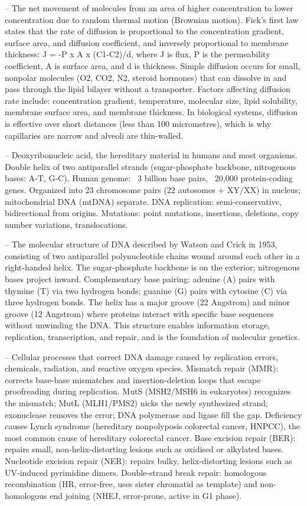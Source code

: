 -- The net movement of molecules from an area of higher concentration to lower concentration due to random thermal motion (Brownian motion). Fick's first law states that the rate of diffusion is proportional to the concentration gradient, surface area, and diffusion coefficient, and inversely proportional to membrane thickness: J = -P x A x (C1-C2)/d, where J is flux, P is the permeability coefficient, A is surface area, and d is thickness. Simple diffusion occurs for small, nonpolar molecules (O2, CO2, N2, steroid hormones) that can dissolve in and pass through the lipid bilayer without a transporter. Factors affecting diffusion rate include: concentration gradient, temperature, molecular size, lipid solubility, membrane surface area, and membrane thickness. In biological systems, diffusion is effective over short distances (less than 100 micrometres), which is why capillaries are narrow and alveoli are thin-walled.

-- Deoxyribonucleic acid, the hereditary material in humans and most organisms. Double helix of two antiparallel strands (sugar-phosphate backbone, nitrogenous bases: A-T, G-C). Human genome: ~3 billion base pairs, ~20,000 protein-coding genes. Organized into 23 chromosome pairs (22 autosomes + XY/XX) in nucleus; mitochondrial DNA (mtDNA) separate. DNA replication: semi-conservative, bidirectional from origins. Mutations: point mutations, insertions, deletions, copy number variations, translocations.

-- The molecular structure of DNA described by Watson and Crick in 1953, consisting of two antiparallel polynucleotide chains wound around each other in a right-handed helix. The sugar-phosphate backbone is on the exterior; nitrogenous bases project inward. Complementary base pairing: adenine (A) pairs with thymine (T) via two hydrogen bonds; guanine (G) pairs with cytosine (C) via three hydrogen bonds. The helix has a major groove (22 Angstrom) and minor groove (12 Angstrom) where proteins interact with specific base sequences without unwinding the DNA. This structure enables information storage, replication, transcription, and repair, and is the foundation of molecular genetics.

-- Cellular processes that correct DNA damage caused by replication errors, chemicals, radiation, and reactive oxygen species. Mismatch repair (MMR): corrects base-base mismatches and insertion-deletion loops that escape proofreading during replication. MutS (MSH2/MSH6 in eukaryotes) recognizes the mismatch; MutL (MLH1/PMS2) nicks the newly synthesized strand; exonuclease removes the error; DNA polymerase and ligase fill the gap. Deficiency causes Lynch syndrome (hereditary nonpolyposis colorectal cancer, HNPCC), the most common cause of hereditary colorectal cancer. Base excision repair (BER): repairs small, non-helix-distorting lesions such as oxidised or alkylated bases. Nucleotide excision repair (NER): repairs bulky, helix-distorting lesions such as UV-induced pyrimidine dimers. Double-strand break repair: homologous recombination (HR, error-free, uses sister chromatid as template) and non-homologous end joining (NHEJ, error-prone, active in G1 phase).

